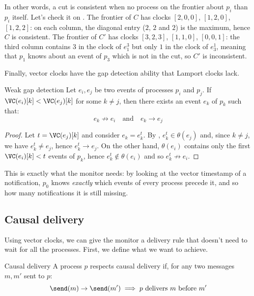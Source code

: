 In other words, a cut is consistent when no process on the frontier  about $p_i$ than $p_i$ itself. Let's check it on . The frontier of $C$ has clocks $[2,0,0]$, $[1,2,0]$, $[1,2,2]$: on each column, the diagonal entry ($2$, $2$ and $2$) is the maximum, hence $C$ is consistent. The frontier of $C'$ has clocks $[3,2,3]$, $[1,1,0]$, $[0,0,1]$: the third column contains $3$ in the clock of $e_1^3$ but only $1$ in the clock of $e_3^1$, meaning that $p_1$ knows about an event of $p_3$ which is not in the cut, so $C'$ is inconsistent.

Finally, vector clocks have the gap detection ability that Lamport clocks lack.

\begin{framedprop}{Weak gap detection}
  Let $e_i, e_j$ be two events of processes $p_i$ and $p_j$. If $\VC(e_i)[k] < \VC(e_j)[k]$ for some $k \neq j$, then there exists an event $e_k$ of $p_k$ such that:
  \[e_k \not\to e_i \quad \text{and} \quad e_k \to e_j\]
\end{framedprop}

\begin{proof}
  Let $t = \VC(e_j)[k]$ and consider $e_k = e_k^t$. By , $e_k^t \in \theta(e_j)$ and, since $k \neq j$, we have $e_k^t \neq e_j$, hence $e_k^t \to e_j$. On the other hand, $\theta(e_i)$ contains only the first $\VC(e_i)[k] < t$ events of $p_k$, hence $e_k^t \notin \theta(e_i)$ and so $e_k^t \not\to e_i$.
\end{proof}

This is exactly what the monitor needs: by looking at the vector timestamp of a notification, $p_0$ knows \textit{exactly} which events of every process precede it, and so how many notifications it is still missing.

\subsection{Causal delivery}

Using vector clocks, we can give the monitor a delivery rule that doesn't need to wait for all the processes. First, we define what we want to achieve.

\begin{frameddefn}{Causal delivery}
  A process $p$ respects causal delivery if, for any two messages $m, m'$ sent to $p$:
  \[\send(m) \to \send(m') \implies \text{$p$ delivers $m$ before $m'$}\]
\end{frameddefn}

